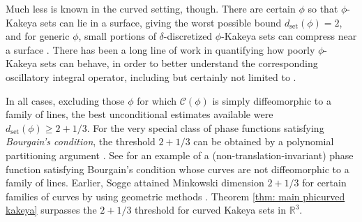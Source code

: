 \documentclass[12pt]{amsart}
\numberwithin{equation}{section}
\newcommand{\R}{\mathbb{R}}
\newcommand{\1}{\mathbbm{1}}
\begin{document}
Much less is known in the curved setting, though. There are certain $\phi$ so that $\phi$-Kakeya sets can lie in a surface, giving the worst possible bound $d_{\mathrm{set}}(\phi)=2$, and for generic $\phi$, small portions of $\delta$-discretized $\phi$-Kakeya sets can compress near a surface \cite{BourgainSeveralVariables}. There has been a long line of work in quantifying how poorly $\phi$-Kakeya sets can behave, in order to better understand the corresponding oscillatory integral operator, including but certainly not limited to \cite{minicozziSogge, soggeChaoticCurvature,  GuthSharpOscillatory, 
HormanderDichotomy, beyondUniversalEstimates, DaiOscillatory, dai2026localgeometryoscillatoryintegrals}. 


In all cases, excluding those $\phi$ for which $\mathcal C(\phi)$ is simply diffeomorphic to a family of lines, the best unconditional estimates available were $d_{\mathrm{set}}(\phi) \geq 2+1/3$. 
For the very special class of phase functions satisfying \emph{Bourgain's condition}, the threshold $2+1/3$ can be obtained by a polynomial partitioning argument \cite{HickmanRogersZhang, DaiOscillatory}. See \cite{nadjimzadah2025bourgainsconditionstickykakeya} for an example of a (non-translation-invariant) phase function satisfying Bourgain's condition whose curves are not diffeomorphic to a family of lines. Earlier, Sogge attained Minkowski dimension $2+1/3$ for certain families of curves by using geometric methods \cite{soggeChaoticCurvature}. Theorem \ref{thm: main phicurved kakeya} surpasses the $2+1/3$ threshold for curved Kakeya sets in $\R^3$. 
\end{document}
